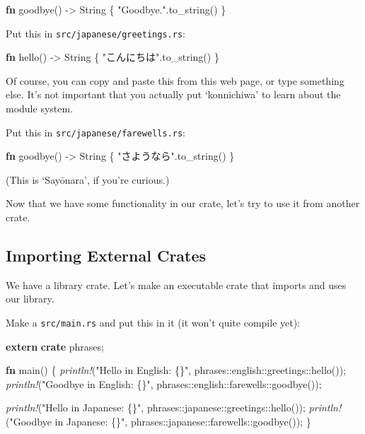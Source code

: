\documentclass[a4paper,]{book}
\newenvironment{Shaded}{\begin{snugshade}}{\end{snugshade}}
\newcommand{\KeywordTok}[1]{\textcolor[rgb]{0.13,0.29,0.53}{\textbf{{#1}}}}
\newcommand{\DataTypeTok}[1]{\textcolor[rgb]{0.13,0.29,0.53}{{#1}}}
\newcommand{\StringTok}[1]{\textcolor[rgb]{0.31,0.60,0.02}{{#1}}}
\newcommand{\PreprocessorTok}[1]{\textcolor[rgb]{0.56,0.35,0.01}{\textit{{#1}}}}
\newcommand{\NormalTok}[1]{{#1}}
\begin{document}
\begin{Shaded}
\begin{Highlighting}[]
\KeywordTok{fn} \NormalTok{goodbye() -> }\DataTypeTok{String} \NormalTok{\{}
    \StringTok{"Goodbye."}\NormalTok{.to_string()}
\NormalTok{\}}
\end{Highlighting}
\end{Shaded}

Put this in \texttt{src/japanese/greetings.rs}:

\begin{Shaded}
\begin{Highlighting}[]
\KeywordTok{fn} \NormalTok{hello() -> }\DataTypeTok{String} \NormalTok{\{}
    \StringTok{"こんにちは"}\NormalTok{.to_string()}
\NormalTok{\}}
\end{Highlighting}
\end{Shaded}

Of course, you can copy and paste this from this web page, or type
something else. It's not important that you actually put `konnichiwa' to
learn about the module system.

Put this in \texttt{src/japanese/farewells.rs}:

\begin{Shaded}
\begin{Highlighting}[]
\KeywordTok{fn} \NormalTok{goodbye() -> }\DataTypeTok{String} \NormalTok{\{}
    \StringTok{"さようなら"}\NormalTok{.to_string()}
\NormalTok{\}}
\end{Highlighting}
\end{Shaded}

(This is `Sayōnara', if you're curious.)

Now that we have some functionality in our crate, let's try to use it
from another crate.

\subsection{Importing External Crates}\label{importing-external-crates}

We have a library crate. Let's make an executable crate that imports and
uses our library.

Make a \texttt{src/main.rs} and put this in it (it won't quite compile
yet):

\begin{Shaded}
\begin{Highlighting}[]
\KeywordTok{extern} \KeywordTok{crate} \NormalTok{phrases;}

\KeywordTok{fn} \NormalTok{main() \{}
    \PreprocessorTok{println!}\NormalTok{(}\StringTok{"Hello in English: \{\}"}\NormalTok{, phrases::english::greetings::hello());}
    \PreprocessorTok{println!}\NormalTok{(}\StringTok{"Goodbye in English: \{\}"}\NormalTok{, phrases::english::farewells::goodbye());}

    \PreprocessorTok{println!}\NormalTok{(}\StringTok{"Hello in Japanese: \{\}"}\NormalTok{, phrases::japanese::greetings::hello());}
    \PreprocessorTok{println!}\NormalTok{(}\StringTok{"Goodbye in Japanese: \{\}"}\NormalTok{, phrases::japanese::farewells::goodbye());}
\NormalTok{\}}
\end{Highlighting}
\end{Shaded}
\end{document}
